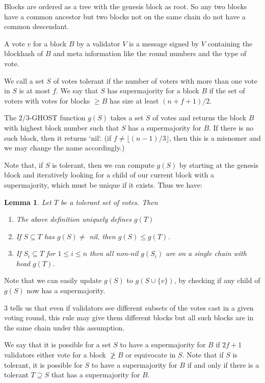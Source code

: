 \documentclass{article}
\newtheorem{lemma}[theorem]{Lemma}
\begin{document}
{Blocks are ordered as a tree with the genesis block as root. So any two blocks have a common ancestor but two blocks not on the same chain do not have a common descendant.

A vote $v$ for a block $B$ by a validator $V$ is a message signed by $V$ containing the blockhash of $B$ and meta information like the round numbers and the type of vote. 

We call a set $S$ of votes tolerant if the number of voters with more than one vote in $S$ is at most $f$. We say that $S$ has supermajority for a block $B$ if the set of voters with votes for blocks $\geq B$ has size at least $(n+f+1)/2$.

The $2/3$-GHOST function $g(S)$ takes a set $S$ of votes and returns the block $B$ with highest block number such that $S$ has a supermajority for $B$. If there is no such block, then it returns `nil`. (if $f \neq \lfloor (n-1)/3 \rfloor$, then this is a misnomer and we may change the name accordingly.)

Note that, if $S$ is tolerant, then we can compute $g(S)$ by starting at the genesis block and iteratively looking for a child of our current block with a supermajority, which must be unique if it exists. Thus we have:
\begin{lemma} \label{lem:ghost-monotonicity}
Let $T$ be a tolerant set of votes. Then
\begin{enumerate}
\item The above definition uniquely defines $g(T)$
\item If $S \subseteq T$ has $g(S) \neq$ nil, then $g(S) \leq g(T)$.
\item If $S_i \subseteq T$ for $1 \leq i \leq n$ then all non-nil $g(S_i)$ are on a single chain with head $g(T)$.
\end{enumerate}

\end{lemma}

Note that we can easily update $g(S)$ to $g(S \cup \{v\})$, by checking if any child of $g(S)$ now has a supermajority.

3 tells us that even if validators see different subsets of the votes cast in a given voting round, this rule may give them different blocks but all such blocks are in the same chain under this assumption. 

We say that it is possible for a set $S$ to have a supermajority for $B$ if $2f+1$ validators either vote for a block $\not \geq B$ or equivocate in $S$. Note that if $S$ is tolerant, it is possible for $S$ to have a supermajority for $B$ if and only if there is a tolerant $T \supseteq S$ that has a supermajority for $B$.


}
\end{document}
